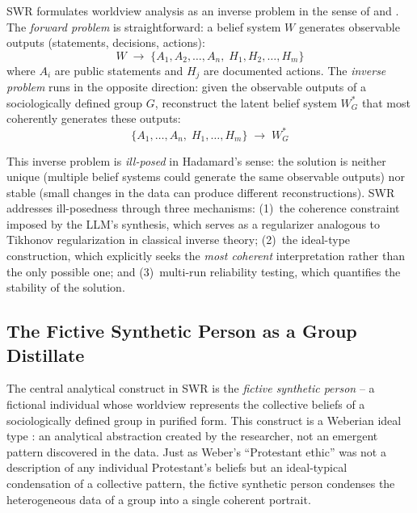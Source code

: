 \documentclass[11pt,a4paper]{article}
\begin{document}
SWR formulates worldview analysis as an inverse problem in the sense of \citet{Hadamard1923} and \citet{Tarantola2005}. The \emph{forward problem} is straightforward: a belief system $W$ generates observable outputs (statements, decisions, actions):
\begin{equation}
  W \;\longrightarrow\; \{A_1, A_2, \ldots, A_n,\; H_1, H_2, \ldots, H_m\}
  \label{eq:forward}
\end{equation}
where $A_i$ are public statements and $H_j$ are documented actions. The \emph{inverse problem} runs in the opposite direction: given the observable outputs of a sociologically defined group $G$, reconstruct the latent belief system $W_G^*$ that most coherently generates these outputs:
\begin{equation}
  \{A_1, \ldots, A_n,\; H_1, \ldots, H_m\} \;\longrightarrow\; W_G^*
  \label{eq:inverse}
\end{equation}

This inverse problem is \emph{ill-posed} in Hadamard's sense: the solution is neither unique (multiple belief systems could generate the same observable outputs) nor stable (small changes in the data can produce different reconstructions). SWR addresses ill-posedness through three mechanisms: (1)~the coherence constraint imposed by the LLM's synthesis, which serves as a regularizer analogous to Tikhonov regularization in classical inverse theory; (2)~the ideal-type construction, which explicitly seeks the \emph{most coherent} interpretation rather than the only possible one; and (3)~multi-run reliability testing, which quantifies the stability of the solution.


\subsection{The Fictive Synthetic Person as a Group Distillate}
\label{sec:method:fiction}

The central analytical construct in SWR is the \emph{fictive synthetic person} -- a fictional individual whose worldview represents the collective beliefs of a sociologically defined group in purified form. This construct is a Weberian ideal type \citep{Weber1904}: an analytical abstraction created by the researcher, not an emergent pattern discovered in the data. Just as Weber's ``Protestant ethic'' was not a description of any individual Protestant's beliefs but an ideal-typical condensation of a collective pattern, the fictive synthetic person condenses the heterogeneous data of a group into a single coherent portrait.
\end{document}

